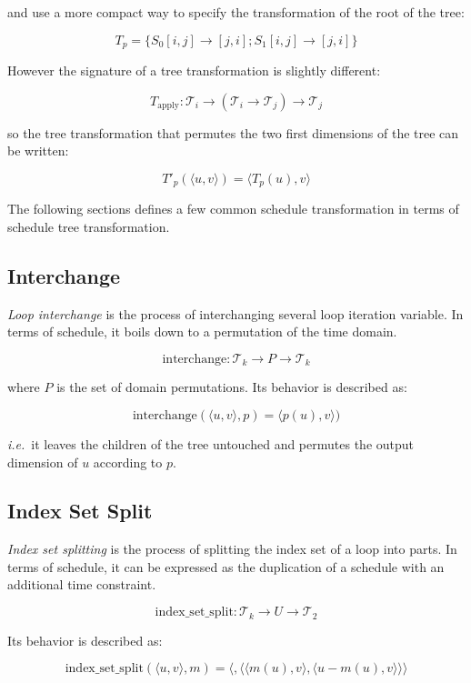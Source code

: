 \documentclass{article}
\begin{document}
\noindent and use a more compact way to specify the transformation of the root of the tree:

\[
    T_p = \{ S_0[i,j] \rightarrow [j,i] ; S_1[i,j] \rightarrow [j,i] \}
\]

However the signature of a tree transformation is slightly different:

\[
    T_\mathrm{apply}: \mathcal{T}_i \rightarrow ( \mathcal{T}_i \rightarrow \mathcal{T}_j) \rightarrow \mathcal{T}_j
\]


\noindent so the tree transformation that permutes the two first dimensions of the tree can be written:

\[
    T'_p(\langle u, v \rangle) = \langle T_p(u), v \rangle
\]


The following sections defines a few common schedule transformation in terms of schedule tree transformation.

\subsection{Interchange}

\emph{Loop interchange} is the process of interchanging several loop iteration
variable. In terms of schedule, it boils down to a permutation of the time
domain.

\[
    \mathrm{interchange}: \mathcal{T}_k \rightarrow P \rightarrow \mathcal{T}_k
\]

\noindent where $P$ is the set of domain permutations. Its behavior is described as:

\[
    \mathrm{interchange}(\langle u, v\rangle, p) = \langle p(u), v\rangle)
\]

\noindent \emph{i.e.}\ it leaves the children of the tree untouched and
permutes the output dimension of $u$ according to $p$.

\subsection{Index Set Split}

\emph{Index set splitting} is the process of splitting the index set of a loop
into parts. In terms of schedule, it can be expressed as the duplication of a
schedule with an additional time constraint.

\[
    \mathrm{index\_set\_split}: \mathcal{T}_k \rightarrow U \rightarrow \mathcal{T}_2
\]

Its behavior is described as:

\[
    \mathrm{index\_set\_split}(\langle u, v\rangle, m) = \langle  {}, \langle  \langle  m(u), v\rangle, \langle  u - m(u), v\rangle \rangle \rangle
\]
\end{document}
